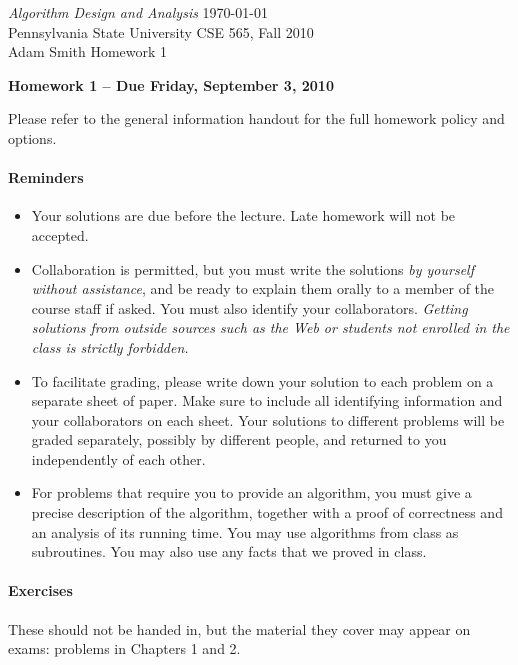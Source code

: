 \documentclass[letterpaper,11pt]{article}
\begin{document}
{\noindent\large
{\em Algorithm Design and Analysis} \hfill \today\\
Pennsylvania State University \hfill CSE 565, Fall 2010\\
Adam Smith \hfill Homework 1\\}
\vspace{1pt} \hrulefill\vspace{3mm}
\begin{center}
{\LARGE\bf Homework 1 -- Due Friday, September 3, 2010}
\end{center}

Please refer to the general information handout for the full homework policy and options.
\paragraph{Reminders}
\begin{itemize}
\item Your solutions are due before the lecture. Late homework will not be accepted.
\item
Collaboration is permitted, but you must write the solutions {\em by
yourself without assistance}, and be ready to explain them orally to
a member of the course staff if asked. You must also identify your
collaborators. {\em Getting solutions from outside sources such as the
Web or students not enrolled in the class is strictly forbidden.}

\item
To facilitate grading, please write down your solution to each problem on a separate sheet of paper. Make sure to include all identifying information and your collaborators on each sheet. Your solutions to different problems will be graded separately, possibly by different people, and returned to you independently of each other.

\item For problems that require you to provide an algorithm, you must
  give a precise description of the algorithm, together with a proof of correctness and an analysis of its running time. You may use algorithms from class as subroutines. You may also use any facts that we proved in class. 

\end{itemize}

\paragraph{Exercises}

These should not be handed in, but the material they cover may
appear on exams: problems in Chapters 1 and 2.
\end{document}
